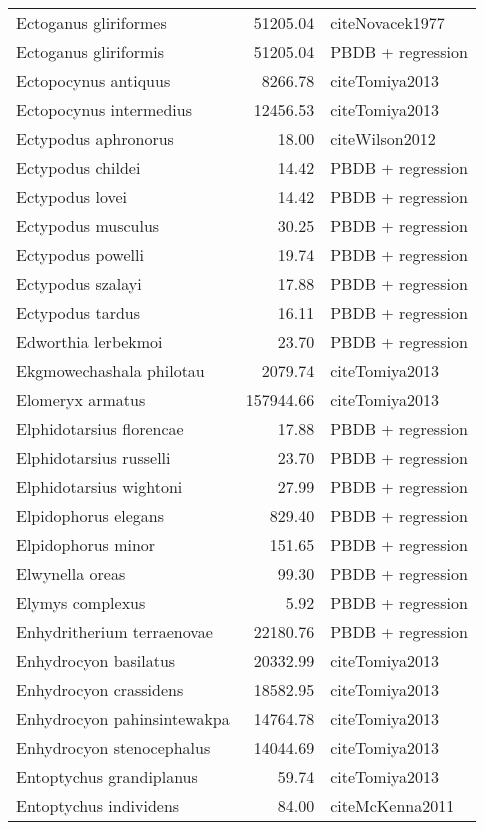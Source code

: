\begin{table}[ht]
\begin{tabular}{lrl}
  Ectoganus gliriformes & 51205.04 & cite{Novacek1977} \\ 
  Ectoganus gliriformis & 51205.04 & PBDB + regression \\ 
  Ectopocynus antiquus & 8266.78 & cite{Tomiya2013} \\ 
  Ectopocynus intermedius & 12456.53 & cite{Tomiya2013} \\ 
  Ectypodus aphronorus & 18.00 & cite{Wilson2012} \\ 
  Ectypodus childei & 14.42 & PBDB + regression \\ 
  Ectypodus lovei & 14.42 & PBDB + regression \\ 
  Ectypodus musculus & 30.25 & PBDB + regression \\ 
  Ectypodus powelli & 19.74 & PBDB + regression \\ 
  Ectypodus szalayi & 17.88 & PBDB + regression \\ 
  Ectypodus tardus & 16.11 & PBDB + regression \\ 
  Edworthia lerbekmoi & 23.70 & PBDB + regression \\ 
  Ekgmowechashala philotau & 2079.74 & cite{Tomiya2013} \\ 
  Elomeryx armatus & 157944.66 & cite{Tomiya2013} \\ 
  Elphidotarsius florencae & 17.88 & PBDB + regression \\ 
  Elphidotarsius russelli & 23.70 & PBDB + regression \\ 
  Elphidotarsius wightoni & 27.99 & PBDB + regression \\ 
  Elpidophorus elegans & 829.40 & PBDB + regression \\ 
  Elpidophorus minor & 151.65 & PBDB + regression \\ 
  Elwynella oreas & 99.30 & PBDB + regression \\ 
  Elymys complexus & 5.92 & PBDB + regression \\ 
  Enhydritherium terraenovae & 22180.76 & PBDB + regression \\ 
  Enhydrocyon basilatus & 20332.99 & cite{Tomiya2013} \\ 
  Enhydrocyon crassidens & 18582.95 & cite{Tomiya2013} \\ 
  Enhydrocyon pahinsintewakpa & 14764.78 & cite{Tomiya2013} \\ 
  Enhydrocyon stenocephalus & 14044.69 & cite{Tomiya2013} \\ 
  Entoptychus grandiplanus & 59.74 & cite{Tomiya2013} \\ 
  Entoptychus individens & 84.00 & cite{McKenna2011} \\ 

\end{tabular}
\end{table}
